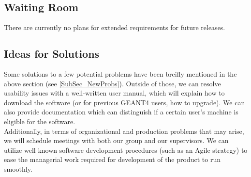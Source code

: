 \documentclass[12pt]{article}
\begin{document}
\subsection{Waiting Room} %
There are currently no plans for extended requirements for future releases.

\subsection{Ideas for Solutions} %
Some solutions to a few potential problems have been breifly mentioned in the above section (see \ref{SubSec_NewProbs}). Outside of those, we can resolve usability issues with a well-written user manual, which will explain how to download the software (or for previous GEANT4 users, how to upgrade). We can also provide documentation which can distinguish if a certain user's machine is eligible for the software. \\
Additionally, in terms of organizational and production problems that may arise, we will schedule meetings with both our group and our supervisors. We can utilize well known software development procedures (such as an Agile strategy) to ease the managerial work required for development of the product to run smoothly.\\
\end{document}
